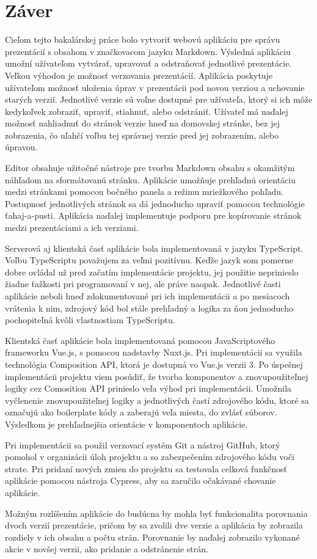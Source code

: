 \chapter{Záver}
\label{kapitola7}
Cieľom tejto bakalárskej práce bolo vytvoriť webovú aplikáciu pre správu prezentácií s obsahom v značkovacom jazyku Markdown. Výsledná aplikáciu umožní užívateľom vytvárať, upravovať a odstraňovať jednotlivé prezentácie. Veľkou výhodou je možnosť verzovania prezentácií. Aplikácia poskytuje užívateľom možnosť uloženia úprav v prezentácii pod novou verziou a uchovanie starých verzií. Jednotlivé verzie sú voľne dostupné pre užívateľa, ktorý si ich môže kedykoľvek zobraziť, upraviť, stiahnuť, alebo odstrániť. Užívateľ má naďalej možnosť nahliadnuť do stránok verzie hneď na domovskej stránke, bez jej zobrazenia, čo uľahčí voľbu tej správnej verzie pred jej zobrazením, alebo úpravou. 

Editor obsahuje užitočné nástroje pre tvorbu Markdown obsahu s okamžitým náhľadom na sformátovanú stránku. Aplikácie umožňuje prehľadnú orientáciu medzi stránkami pomocou bočného panela a režimu mriežkového pohľadu. Postupnosť jednotlivých stránok sa dá jednoducho upraviť pomocou technológie ťahaj-a-pusti. Aplikácia naďalej implementuje podporu pre kopírovanie stránok medzi prezentáciami a ich verziami.

Serverová aj klientská časť aplikácie bola implementovaná v jazyku TypeScript. Voľbu TypeScriptu považujem za veľmi pozitívnu. Keďže jazyk som pomerne dobre ovládal už pred začatím implementácie projektu, jej použitie neprinieslo žiadne ťažkosti pri programovaní v nej, ale práve naopak. Jednotlivé časti aplikácie neboli hneď zdokumentované pri ich implementácii a po mesiacoch vrátenia k nim, zdrojový kód bol stále prehľadný a logika za ňou jednoducho pochopiteľná kvôli vlastnostiam TypeScriptu. 

Klientská časť aplikácie bola implementovaná pomocou JavaScriptového frameworku Vue.js, s pomocou nadstavby Nuxt.js. Pri implementácii sa využila technológia Composition API, ktorá je dostupná vo Vue.js verzii 3. Po úspešnej implementácii projektu viem posúdiť, že tvorba komponentov a znovupoužiteľnej logiky cez Comosition API prinieslo veľa výhod pri implementácii. Umožnila vyčlenenie znovupoužiteľnej logiky a jednotlivých častí zdrojového kódu, ktoré sa označujú ako boilerplate kódy a zaberajú veľa miesta, do zvlásť súborov. Výsledkom je prehľadnejšia orientácie v komponentoch aplikácie. 

Pri implementácii sa použil verzovací systém Git a nástroj GitHub, ktorý pomohol v organizácii úloh projektu a so zabezpečením zdrojového kódu voči strate. Pri pridaní nových zmien do projektu sa testovala celková funkčnosť aplikácie pomocou nástroja Cypress, aby sa zaručilo očakávané chovanie aplikácie.

Možným rozlíšením aplikácie do budúcna by mohla byť funkcionalita porovnania dvoch verzií prezentácie, pričom by sa zvolili dve verzie a aplikácia by zobrazila rozdiely v ich obsahu a počtu strán. Porovnanie by naďalej zobrazilo vykonané akcie v novšej verzii, ako pridanie a odstránenie strán.